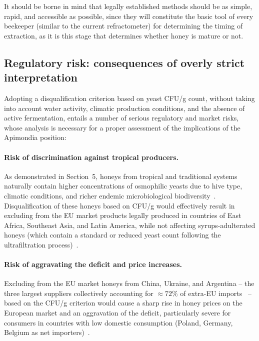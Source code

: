 It should be borne in mind that legally established methods should
be as simple, rapid, and accessible as possible, since they will
constitute the basic tool of every beekeeper (similar to the current
refractometer) for determining the timing of extraction, as it is
this stage that determines whether honey is mature or not.

\subsection{Regulatory risk: consequences of overly strict interpretation}

Adopting a disqualification criterion based on yeast CFU/g count,
without taking into account water activity, climatic production
conditions, and the absence of active fermentation, entails a number
of serious regulatory and market risks, whose analysis is necessary
for a proper assessment of the implications of the Apimondia
position:

\paragraph{Risk of discrimination against tropical producers.}
As demonstrated in Section~5, honeys from tropical and traditional
systems naturally contain higher concentrations of osmophilic yeasts
due to hive type, climatic conditions, and richer endemic
microbiological
biodiversity~\cite{tadele2025,stinglessyeastbrazil2021}.
Disqualification of these honeys based on CFU/g would effectively
result in excluding from the EU market products legally produced
in countries of East Africa, Southeast Asia, and Latin America,
while not affecting syrups-adulterated honeys (which contain a
standard or reduced yeast count following the ultrafiltration
process)~\cite{eufromhives2021}.

\paragraph{Risk of aggravating the deficit and price increases.}
Excluding from the EU market honeys from China, Ukraine, and
Argentina -- the three largest suppliers collectively accounting
for $\approx 72\%$ of extra-EU imports~\cite{tridge2024} -- based
on the CFU/g criterion would cause a sharp rise in honey prices
on the European market and an aggravation of the deficit,
particularly severe for consumers in countries with low domestic
consumption (Poland, Germany, Belgium as net
importers)~\cite{eurostat_honey2023}.

